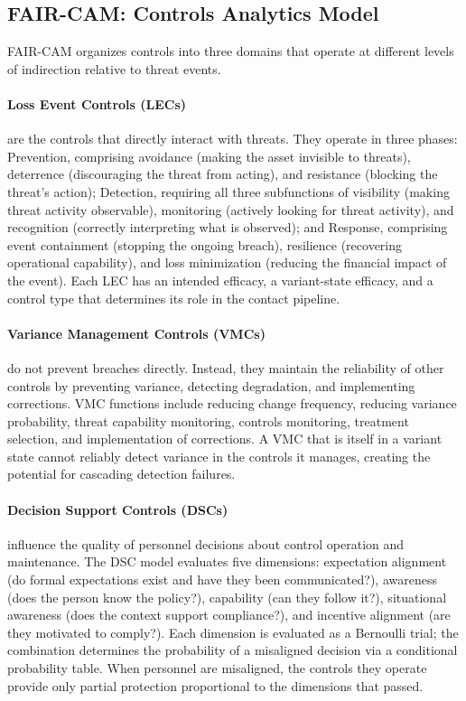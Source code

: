 \documentclass[11pt,a4paper]{article}
\begin{document}
\subsection{FAIR-CAM: Controls Analytics Model}
\label{sec:faircam}

FAIR-CAM organizes controls into three domains that operate at different levels of indirection relative to threat events.

\paragraph{Loss Event Controls (LECs)} are the controls that directly interact with threats. They operate in three phases: Prevention, comprising avoidance (making the asset invisible to threats), deterrence (discouraging the threat from acting), and resistance (blocking the threat's action); Detection, requiring all three subfunctions of visibility (making threat activity observable), monitoring (actively looking for threat activity), and recognition (correctly interpreting what is observed); and Response, comprising event containment (stopping the ongoing breach), resilience (recovering operational capability), and loss minimization (reducing the financial impact of the event). Each LEC has an intended efficacy, a variant-state efficacy, and a control type that determines its role in the contact pipeline.

\paragraph{Variance Management Controls (VMCs)} do not prevent breaches directly. Instead, they maintain the reliability of other controls by preventing variance, detecting degradation, and implementing corrections. VMC functions include reducing change frequency, reducing variance probability, threat capability monitoring, controls monitoring, treatment selection, and implementation of corrections. A VMC that is itself in a variant state cannot reliably detect variance in the controls it manages, creating the potential for cascading detection failures.

\paragraph{Decision Support Controls (DSCs)} influence the quality of personnel decisions about control operation and maintenance. The DSC model evaluates five dimensions: expectation alignment (do formal expectations exist and have they been communicated?), awareness (does the person know the policy?), capability (can they follow it?), situational awareness (does the context support compliance?), and incentive alignment (are they motivated to comply?). Each dimension is evaluated as a Bernoulli trial; the combination determines the probability of a misaligned decision via a conditional probability table. When personnel are misaligned, the controls they operate provide only partial protection proportional to the dimensions that passed.
\end{document}
